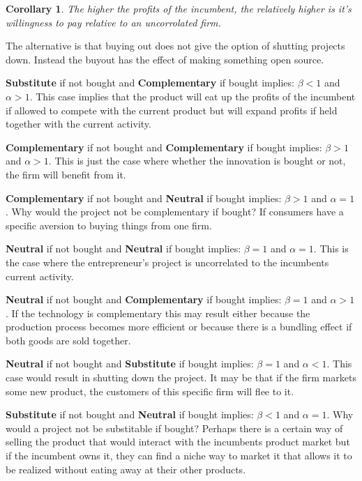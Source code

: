 \documentclass[12pt]{report}
\newtheorem{corollary}[theorem]{Corollary}
\numberwithin{equation}{section}
\begin{document}
\begin{corollary}
The higher the profits of the incumbent, the relatively higher is it's willingness to pay relative to an uncorrolated firm. 
\end{corollary}

The alternative is that buying out does not give the option of shutting projects down. Instead the buyout has the effect of making something open source. 

\textbf{Substitute}  if not bought and \textbf{Complementary} if bought implies: $\beta<1$ and $\alpha>1$. This case implies that the product will eat up the profits of the incumbent if allowed to compete with the current product but will expand profits if held together with the current activity. 

\textbf{Complementary} if not bought and \textbf{Complementary} if bought implies: $\beta>1$ and $\alpha>1$. This is just the case where whether the innovation is bought or not, the firm will benefit from it.

\textbf{Complementary} if not bought and \textbf{Neutral} if bought implies: $\beta>1$ and $\alpha=1$. Why would the project not be complementary if bought? If consumers have a specific aversion to buying things from one firm. 

\textbf{Neutral} if not bought and \textbf{Neutral} if bought implies: $\beta=1$ and $\alpha=1$. This is the case where the entrepreneur's project is uncorrelated to the incumbents current activity.  

\textbf{Neutral} if not bought and \textbf{Complementary} if bought implies: $\beta=1$ and $\alpha>1$. If the technology is complementary this may result either because the production process becomes more efficient or because there is a bundling effect if both goods are sold together. 

\textbf{Neutral} if not bought and \textbf{Substitute} if bought implies: $\beta=1$ and $\alpha<1$. This case would result in shutting down the project. It may be that if the firm markets some new product, the customers of this specific firm will flee to it. 

\textbf{Substitute} if not bought and \textbf{Neutral} if bought implies: $\beta<1$ and $\alpha=1$. Why would a project not be substitable if bought? Perhaps there is a certain way of selling the product that would interact with the incumbents product market but if the incumbent owns it, they can find a niche way to market it that allows it to be realized without eating away at their other products.




\end{document}

